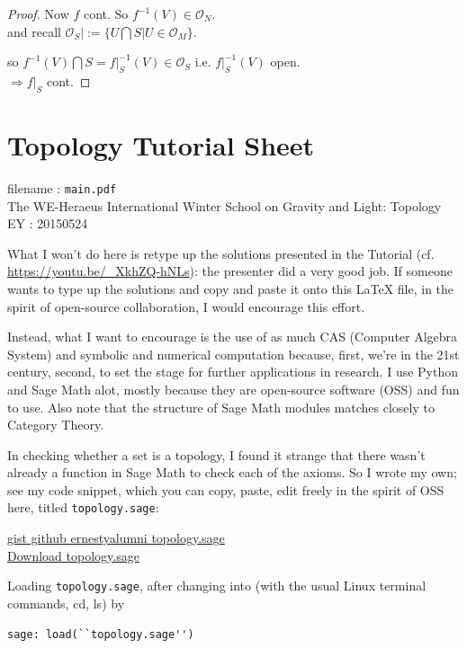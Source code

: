 \documentclass[10pt]{amsart}
\begin{document}
\begin{multicols*}{2}
\begin{proof}
	Now $f$ cont. So $f^{-1}(V) \in \mathcal{O}_N$.  \\
	and recall $\left. \mathcal{O}_S \right| := \lbrace U \bigcap S | U \in \mathcal{O}_M \rbrace$.  
	
	so $f^{-1}(V) \bigcap S = \left. f \right|_S^{-1}(V) \in \mathcal{O}_S$ i.e. $\left. f\right|_S^{-1}(V)$ open. \\
	$\Longrightarrow \left. f\right|_S$ cont.  
\end{proof}

\section*{Topology Tutorial Sheet}
filename : \texttt{main.pdf} \\
The WE-Heraeus International Winter School on Gravity and Light: Topology \\

EY : 20150524  

What I won't do here is retype up the solutions presented in the Tutorial (cf. \url{https://youtu.be/_XkhZQ-hNLs}): the presenter did a very good job.  If someone wants to type up the solutions and copy and paste it onto this LaTeX file, in the spirit of open-source collaboration, I would encourage this effort. 

Instead, what I want to encourage is the use of as much CAS (Computer Algebra System) and symbolic and numerical computation because, first, we're in the 21st century, second, to set the stage for further applications in research.  I use Python and Sage Math alot, mostly because they are open-source software (OSS) and fun to use.  Also note that the structure of Sage Math modules matches closely to Category Theory.  

In checking whether a set is a topology, I found it strange that there wasn't already a function in Sage Math to check each of the axioms.  So I wrote my own; see my code snippet, which you can copy, paste, edit freely in the spirit of OSS here, titled \texttt{topology.sage}: 

\href{https://gist.github.com/ernestyalumni/903eefd01be1f214598b}{gist github ernestyalumni topology.sage} \\
\href{https://gist.githubusercontent.com/ernestyalumni/903eefd01be1f214598b/raw/67083e3b3dec2faf2087713236b413b741bd1180/topology.sage}{Download topology.sage}

Loading \texttt{topology.sage}, after changing into (with the usual Linux terminal commands, cd, ls) by 
\begin{lstlisting}[frame=single]
sage: load(``topology.sage'')
\end{lstlisting}


\end{multicols*}
\end{document}
